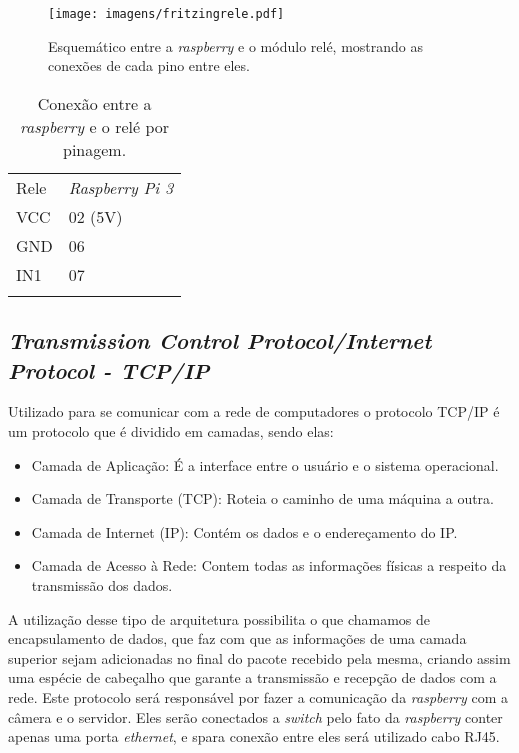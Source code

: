     \begin{figure}[H]
    \centering
    \texttt{[image: imagens/fritzingrele.pdf]}
    \caption{Esquemático entre a \emph{raspberry} e o módulo relé, mostrando as conexões de cada pino entre eles.}
    \label{fritizingrele}
\end{figure}

  \begin{table}[h]
 \centering
 {\renewcommand\arraystretch{1.25}
 \caption{Conexão entre a \emph{raspberry} e o relé por pinagem.}
 \begin{tabular}{ l l }
  \cline{1-1}\cline{2-2}  
    \multicolumn{1}{|p{3.850cm}|}{Rele \centering } &
    \multicolumn{1}{p{4.217cm}|}{\emph{Raspberry Pi 3} \centering }
  \\  
  \cline{1-1}\cline{2-2}  
    \multicolumn{1}{|p{3.850cm}|}{VCC \centering } &
    \multicolumn{1}{p{4.217cm}|}{02 (5V) \centering }
  \\  
  \cline{1-1}\cline{2-2}  
    \multicolumn{1}{|p{3.850cm}|}{GND \centering } &
    \multicolumn{1}{p{4.217cm}|}{06  \centering }
  \\  
  \cline{1-1}\cline{2-2}  
    \multicolumn{1}{|p{3.850cm}|}{IN1 \centering } &
    \multicolumn{1}{p{4.217cm}|}{07 \centering }
  \\  
   \hline
\label{tabelarele}
 \end{tabular} }
\end{table}  


\subsection{ \emph{Transmission Control Protocol/Internet Protocol - TCP/IP}}
Utilizado para se comunicar com a rede de computadores o protocolo TCP/IP é um protocolo que é dividido em camadas, sendo elas:
\begin{itemize}
    \item Camada de Aplicação: É a interface entre o usuário e o sistema operacional.
    \item Camada de Transporte (TCP): Roteia o caminho de uma máquina a outra.
    \item Camada de Internet (IP): Contém os dados e o endereçamento do IP.
    \item Camada de Acesso à Rede: Contem todas as informações físicas a respeito da transmissão dos dados.
    
\end{itemize}

A utilização desse tipo de arquitetura possibilita o que chamamos de encapsulamento de dados, que faz com que as informações de uma camada superior sejam adicionadas no final do pacote recebido pela mesma, criando assim uma espécie de cabeçalho que garante a transmissão e recepção de dados com a rede.
Este protocolo será responsável por fazer a comunicação da \emph{raspberry} com a câmera e o servidor. Eles serão conectados a \emph{switch} pelo fato da \emph{raspberry} conter apenas uma porta \emph{ethernet}, e spara conexão entre eles será utilizado cabo RJ45.


